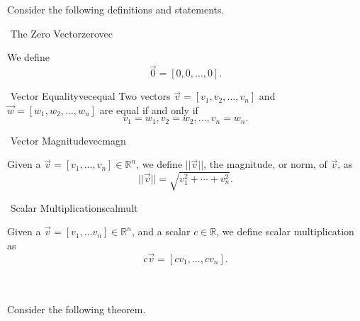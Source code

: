    \vphantom
    \pagebreak
    \\
    \\
    Consider the following definitions and statements.
    \begin{definition}{\Stop\,\,The Zero Vector}{zerovec}

        We define 
        \begin{equation*}
            \vec{0}=[0,0,\ldots,0].
        \end{equation*}
        
    \end{definition}
    \begin{definition}{\Stop\,\,Vector Equality}{vecequal}
        Two vectors \(\vec{v}=[v_1,v_2,\ldots,v_n]\) and \(\vec{w}=[w_1,w_2,\ldots,w_n]\) are equal if and only if
        \begin{equation*}
            v_1=w_1,v_2=w_2,\ldots,v_n=w_n.
        \end{equation*}
    \end{definition}
    \begin{definition}{\Stop\,\,Vector Magnitude}{vecmagn}

        Given a \(\vec{v}=[v_1,\ldots, v_n]\in\mathbb{R}^n\), we define \(||\vec{v}||\), the magnitude, or norm, of \(\vec{v}\), as
        \begin{equation*}
            ||\vec{v}||=\sqrt{v_1^2+\cdots+v_n^2}.
        \end{equation*}
        
    \end{definition}
    \begin{definition}{\Stop\,\,Scalar Multiplication}{scalmult}

        Given a \(\vec{v}=[v_1,\ldots v_n]\in\mathbb{R}^n\), and a scalar \(c\in\mathbb{R}\), we define scalar multiplication as
        \begin{equation*}
            c\vec{v}=[cv_1,\ldots, cv_n].
        \end{equation*}
        
    \end{definition}
    \vphantom
    \\
    \\
    Consider the following theorem.
